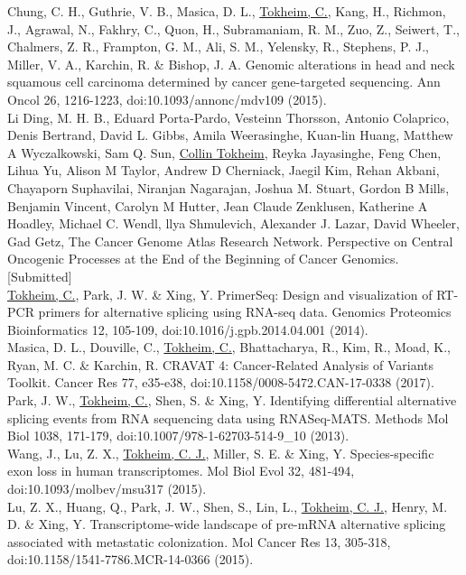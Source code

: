 \begin{vita}
Chung, C. H., Guthrie, V. B., Masica, D. L., \underline{Tokheim, C.}, Kang, H., Richmon, J., Agrawal, N., Fakhry, C., Quon, H., Subramaniam, R. M., Zuo, Z., Seiwert, T., Chalmers, Z. R., Frampton, G. M., Ali, S. M., Yelensky, R., Stephens, P. J., Miller, V. A., Karchin, R. \& Bishop, J. A. Genomic alterations in head and neck squamous cell carcinoma determined by cancer gene-targeted sequencing. Ann Oncol 26, 1216-1223, doi:10.1093/annonc/mdv109 (2015).\\

Li Ding, M. H. B., Eduard Porta-Pardo, Vesteinn Thorsson, Antonio Colaprico, Denis Bertrand, David L. Gibbs, Amila Weerasinghe, Kuan-lin Huang, Matthew A Wyczalkowski, Sam Q. Sun, \underline{Collin Tokheim}, Reyka Jayasinghe, Feng Chen, Lihua Yu, Alison M Taylor, Andrew D Cherniack, Jaegil Kim, Rehan Akbani, Chayaporn Suphavilai, Niranjan Nagarajan, Joshua M. Stuart, Gordon B Mills, Benjamin Vincent, Carolyn M Hutter, Jean Claude Zenklusen, Katherine A Hoadley, Michael C. Wendl, llya Shmulevich, Alexander J. Lazar, David Wheeler, Gad Getz, The Cancer Genome Atlas Research Network. Perspective on Central Oncogenic Processes at the End of the Beginning of Cancer Genomics. [Submitted]\\

\underline{Tokheim, C.}, Park, J. W. \& Xing, Y. PrimerSeq: Design and visualization of RT-PCR primers for alternative splicing using RNA-seq data. Genomics Proteomics Bioinformatics 12, 105-109, doi:10.1016/j.gpb.2014.04.001 (2014).\\

Masica, D. L., Douville, C., \underline{Tokheim, C.}, Bhattacharya, R., Kim, R., Moad, K., Ryan, M. C. \& Karchin, R. CRAVAT 4: Cancer-Related Analysis of Variants Toolkit. Cancer Res 77, e35-e38, doi:10.1158/0008-5472.CAN-17-0338 (2017).\\

Park, J. W., \underline{Tokheim, C.}, Shen, S. \& Xing, Y. Identifying differential alternative splicing events from RNA sequencing data using RNASeq-MATS. Methods Mol Biol 1038, 171-179, doi:10.1007/978-1-62703-514-9\_10 (2013).\\

Wang, J., Lu, Z. X., \underline{Tokheim, C. J.}, Miller, S. E. \& Xing, Y. Species-specific exon loss in human transcriptomes. Mol Biol Evol 32, 481-494, doi:10.1093/molbev/msu317 (2015). \\

Lu, Z. X., Huang, Q., Park, J. W., Shen, S., Lin, L., \underline{Tokheim, C. J.}, Henry, M. D. \& Xing, Y. Transcriptome-wide landscape of pre-mRNA alternative splicing associated with metastatic colonization. Mol Cancer Res 13, 305-318, doi:10.1158/1541-7786.MCR-14-0366 (2015). \\


\end{vita}

